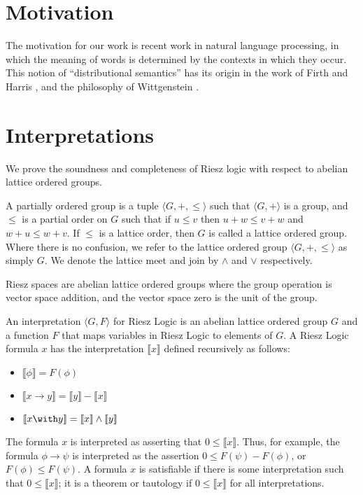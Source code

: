 \documentclass[preprint,leqno]{elsarticle}
\newcommand{\interp}[1]{\llbracket #1 \rrbracket}
\begin{document}
\section{Motivation}

The motivation for our work is recent work in natural language
processing, in which the meaning of words is determined by the
contexts in which they occur. This notion of ``distributional
semantics'' has its origin in the work of Firth \cite{Firth:57} and
Harris \cite{Harris:68}, and the philosophy of Wittgenstein
\cite{Wittgenstein:53}.

\section{Interpretations}

We prove the soundness and completeness of Riesz logic with respect to
abelian lattice ordered groups.

\begin{definition}
  A partially ordered group is a tuple $\langle G, +, \le\rangle$ such
  that $\langle G, +\rangle$ is a group, and $\le$ is a partial order
  on $G$ such that if $u \le v$ then $u + w \le v + w$ and $w + u \le
  w + v$. If $\le$ is a lattice order, then $G$ is called a lattice
  ordered group. Where there is no confusion, we refer to the lattice
  ordered group $\langle G, +, \le\rangle$ as simply $G$. We denote
  the lattice meet and join by $\land$ and $\lor$ respectively.
\end{definition}

Riesz spaces are abelian lattice ordered groups where the group
operation is vector space addition, and the vector space zero is the
unit of the group.

An interpretation $\langle G, F\rangle$ for Riesz Logic
is an abelian lattice ordered group $G$ and a function $F$ that maps
variables in Riesz Logic to elements of $G$. A Riesz Logic formula $x$
has the interpretation $\interp{x}$ defined recursively as follows:
\begin{itemize}
\item $\interp{\phi} = F(\phi)$
\item $\interp{x \rightarrow y} = \interp{y} - \interp{x}$
\item $\interp{x \with y} = \interp{x} \land \interp{y}$
\end{itemize}
The formula $x$ is interpreted as asserting that $0 \le
\interp{x}$. Thus, for example, the formula $\phi \rightarrow \psi$ is
interpreted as the assertion $0 \le F(\psi) - F(\phi)$, or $F(\phi)
\le F(\psi)$. A formula $x$ is satisfiable if there is some
interpretation such that $0 \le \interp{x}$; it is a theorem or
tautology if $0 \le \interp{x}$ for all interpretations.
\end{document}
